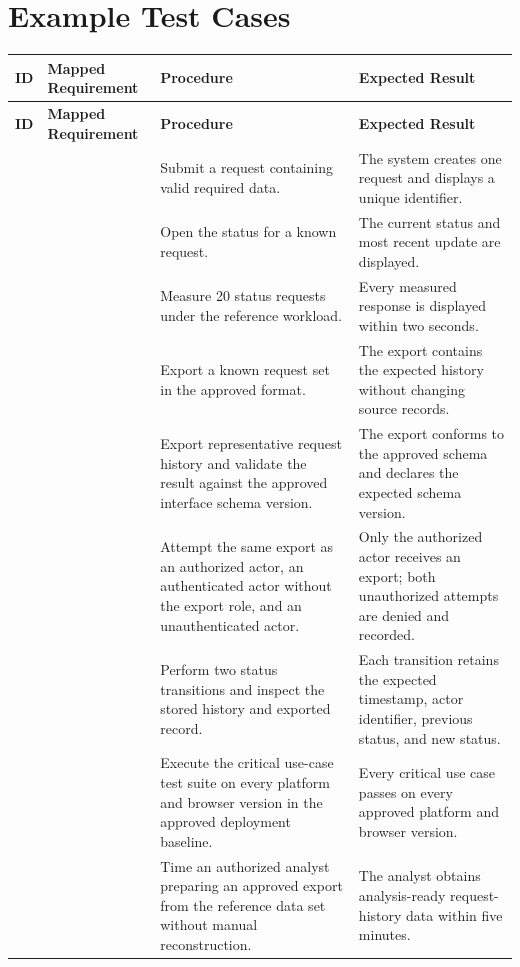 \section{Example Test Cases}
\begin{tabularx}{\linewidth}{L{2.1cm}L{3.0cm}YL{5.0cm}}
\caption{Test Case Examples\label{Table:TestCaseExamples}}\\
\toprule
\textbf{ID} & \textbf{Mapped Requirement} & \textbf{Procedure} & \textbf{Expected Result}\\
\midrule
\endfirsthead
\toprule
\textbf{ID} & \textbf{Mapped Requirement} & \textbf{Procedure} & \textbf{Expected Result}\\
\midrule
\endhead
{} &  & Submit a request containing valid required data. & The system creates one request and displays a unique identifier.\\
 &  & Open the status for a known request. & The current status and most recent update are displayed.\\
 &  & Measure 20 status requests under the reference workload. & Every measured response is displayed within two seconds.\\
 &  & Export a known request set in the approved format. & The export contains the expected history without changing source records.\\
 &  & Export representative request history and validate the result against the approved interface schema version. & The export conforms to the approved schema and declares the expected schema version.\\
 &  & Attempt the same export as an authorized actor, an authenticated actor without the export role, and an unauthenticated actor. & Only the authorized actor receives an export; both unauthorized attempts are denied and recorded.\\
 &  & Perform two status transitions and inspect the stored history and exported record. & Each transition retains the expected timestamp, actor identifier, previous status, and new status.\\
 &  & Execute the critical use-case test suite on every platform and browser version in the approved deployment baseline. & Every critical use case passes on every approved platform and browser version.\\
 &  & Time an authorized analyst preparing an approved export from the reference data set without manual reconstruction. & The analyst obtains analysis-ready request-history data within five minutes.\\
\bottomrule
\end{tabularx}
